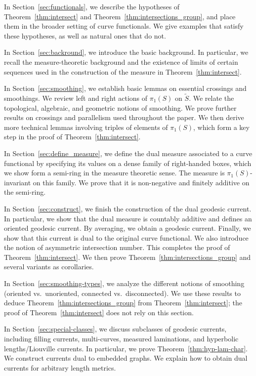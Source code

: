 \documentclass[11pt]{amsart}
\numberwithin{equation}{section}
\numberwithin{figure}{section}
\theoremstyle{definition}
\theoremstyle{plain}
\newcommand*{\wt}[1]{\widetilde{#1}}
\begin{document}
In Section~\ref{sec:functionals}, we describe the hypotheses of Theorem~\ref{thm:intersect} and Theorem~\ref{thm:intersections_group}, and place them in the broader setting of curve functionals. We give examples that satisfy these hypotheses, as well as natural ones that do not.

In Section~\ref{sec:backround}, we introduce the basic background. In particular, we recall the measure-theoretic background and the existence of limits of certain sequences used in the construction of the measure in Theorem~\ref{thm:intersect}. 

In Section~\ref{sec:smoothing}, we establish basic lemmas on essential crossings and smoothings. We review left and right actions of $\pi_1(S)$ on $\wt{S}$. We relate the topological, algebraic, and geometric notions of smoothing. We prove further results on crossings and parallelism used throughout the paper. We then derive more technical lemmas involving triples of elements of $\pi_1(S)$, which form a key step in the proof of Theorem~\ref{thm:intersect}.

In Section~\ref{sec:define_measure}, we define the dual measure associated to a curve functional by specifying its values on a dense family of right-handed boxes, which we show form a semi-ring in the measure theoretic sense. The measure is $\pi_1(S)$-invariant on this family. We prove that it is non-negative and finitely additive on the semi-ring.

In Section~\ref{sec:construct}, we finish the construction of the dual geodesic current. In particular, we show that the dual measure is countably additive and defines an oriented geodesic current. By averaging, we obtain a geodesic current. Finally, we show that this current is dual to the original curve functional. We also introduce the notion of asymmetric intersection number. This completes the proof of Theorem~\ref{thm:intersect}. We then prove Theorem~\ref{thm:intersections_group} and several variants as corollaries.

In Section~\ref{sec:smoothing-types}, we analyze the different notions
of smoothing (oriented vs.\ unoriented, connected vs.\ disconnected). We use
these results to deduce Theorem~\ref{thm:intersections_group} from
Theorem~\ref{thm:intersect}; the proof of Theorem~\ref{thm:intersect}
does not rely on this section.

In Section~\ref{sec:special-classes}, we discuss subclasses of
geodesic currents, including filling currents, multi-curves, measured
laminations, and hyperbolic lengths/Liouville currents. In particular,
we prove Theorem~\ref{thm:hyp-lam-char}. We
construct currents dual to
embedded graphs. We explain how to obtain dual currents for arbitrary
length metrics.
\end{document}
